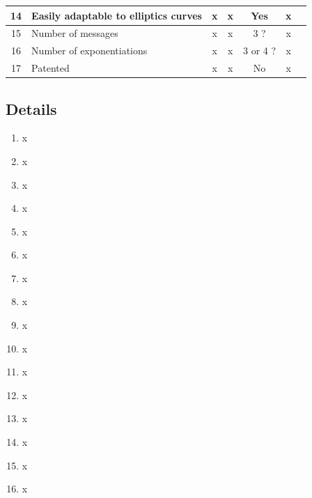 \documentclass[../report.tex]{subfiles}
\begin{document}
\begin{center}
\begin{tabular}{ | c | p{8cm} || c | c | c | c | c | }
     
     14 & Easily adaptable to elliptics curves & x & x & Yes & x \\ \hline
     15 & Number of messages & x & x & 3 ? & x \\ \hline
     16 & Number of exponentiations & x & x & 3 or 4 ? & x \\ \hline
     17 & Patented & x & x & No & x \\ \hline

     \end{tabular}
 \end{center}
 
\subsection{Details} \label{sec:comparison_details}

\begin{enumerate}
 \item x
 \item x
 \item x
 \item x
 \item x
 \item x
 \item x
 \item x
 \item x
 \item x
 \item x
 \item x
 \item x
 \item x
 \item x
 \item x
\end{enumerate}
\end{document}
